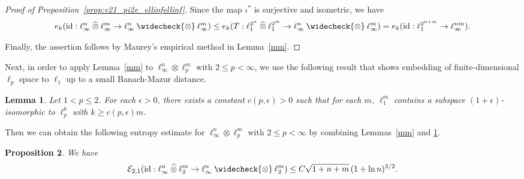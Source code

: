 \documentclass[11pt]{article}
\newtheorem{lemma}{Lemma}[section]
\newtheorem{prop}[lemma]{Proposition}
\begin{document}
\begin{proof}[Proof of Proposition~\ref{prop:e21_pi2e_ellinfellinf}]
Since the map $\iota^*$ is surjective and isometric, we have
\begin{align*}
e_k(\mathrm{id}: \ell_\infty^n \mathbin{\widehat{\otimes}} \ell_\infty^m \to \ell_\infty^n \mathbin{\widecheck{\otimes}} \ell_\infty^m)
\leq
e_k(T: \ell_1^{2^n} \mathbin{\widehat{\otimes}} \ell_1^{2^m} \to \ell_\infty^n \mathbin{\widecheck{\otimes}} \ell_\infty^m)
=
e_k(\mathrm{id}: \ell_1^{2^{n+m}} \to \ell_\infty^{nm}).
\end{align*}

Finally, the assertion follows by Maurey's empirical method in Lemma~\ref{mm}.
\end{proof}

\noindent Next, in order to apply Lemma~\ref{mm} to $\ell_\infty^n \otimes \ell_p^m$ with $2 \leq p < \infty$, we use the following result that shows embedding of finite-dimensional $\ell_p$ space to $\ell_1$ up to a small Banach-Mazur distance.

\begin{lemma}\cite[Lemma~5]{carl1985inequalities}
\label{embed}
Let $1 < p \leq 2$. For each $\epsilon > 0$, there exists a constant $c(p,\epsilon) > 0$ such that for each $m$, $\ell_1^m$ contains a subspace $(1+\epsilon)$-isomorphic to $\ell_p^k$ with $k \geq c(p,\epsilon) m$.
\end{lemma}

\noindent Then we can obtain the following entropy estimate for $\ell_\infty^n \otimes \ell_p^m$ with $2 \leq p < \infty$ by combining Lemmas~\ref{mm} and \ref{embed}.

\begin{prop}
We have
\label{prop:e21_pi2e_ellinfell2}
\begin{align*}
\mathcal{E}_{2,1}(\mathrm{id}: \ell_\infty^n \mathbin{\widehat{\otimes}} \ell_2^m \to \ell_\infty^n \mathbin{\widecheck{\otimes}} \ell_2^m)
\leq C \sqrt{1+n+m} \, (1+\ln n)^{3/2}.
\end{align*}
\end{prop}
\end{document}
